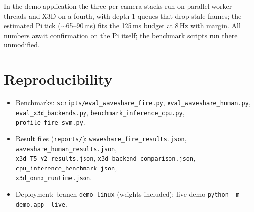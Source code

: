 \documentclass[11pt]{article}
\newcommand{\code}[1]{\texttt{\small #1}}
\begin{document}
In the demo application the three per-camera stacks run on parallel worker
threads and X3D on a fourth, with depth-1 queues that drop stale frames;
the estimated Pi tick ($\sim$65--90\,ms) fits the 125\,ms budget at 8\,Hz
with margin. All numbers await confirmation on the Pi itself; the
benchmark scripts run there unmodified.

\section{Reproducibility}

\begin{itemize}
\item Benchmarks: \code{scripts/eval\_waveshare\_fire.py},
      \code{eval\_waveshare\_human.py}, \code{eval\_x3d\_backends.py},
      \code{benchmark\_inference\_cpu.py}, \code{profile\_fire\_svm.py}.
\item Result files (\code{reports/}): \code{waveshare\_fire\_results.json},
      \code{waveshare\_human\_results.json},\\
      \code{x3d\_T5\_v2\_results.json},
      \code{x3d\_backend\_comparison.json},
      \code{cpu\_inference\_benchmark.json},\\
      \code{x3d\_onnx\_runtime.json}.
\item Deployment: branch \code{demo-linux} (weights included);
      live demo \code{python -m demo.app --live}.
\end{itemize}
\end{document}
